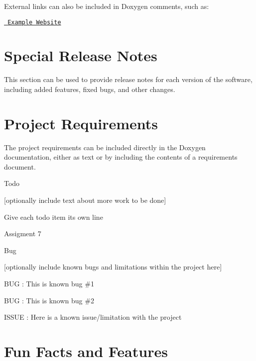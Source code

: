 External links can also be included in Doxygen comments, such as\+:
\begin{DoxyItemize}
\item \href{http://www.example.com/}{\texttt{ Example Website}}
\end{DoxyItemize}



 \hypertarget{index_notes}{}\section{Special Release Notes}\label{index_notes}
This section can be used to provide release notes for each version of the software, including added features, fixed bugs, and other changes.



 \hypertarget{index_requirements}{}\section{Project Requirements}\label{index_requirements}
The project requirements can be included directly in the Doxygen documentation, either as text or by including the contents of a requirements document.



 \begin{DoxyRefDesc}{Todo}
\item[\mbox{\hyperlink{todo__todo000001}{Todo}}]\mbox{[}optionally include text about more work to be done\mbox{]} 

Give each todo item its own line 

Assigment 7\end{DoxyRefDesc}




 \begin{DoxyRefDesc}{Bug}
\item[\mbox{\hyperlink{bug__bug000001}{Bug}}]\mbox{[}optionally include known bugs and limitations within the project here\mbox{]}
\begin{DoxyItemize}
\item B\+UG \+: This is known bug \#1
\item B\+UG \+: This is known bug \#2
\item I\+S\+S\+UE \+: Here is a known issue/limitation with the project
\end{DoxyItemize}\end{DoxyRefDesc}




 \hypertarget{index_funfacts}{}\section{Fun Facts and Features}\label{index_funfacts}

